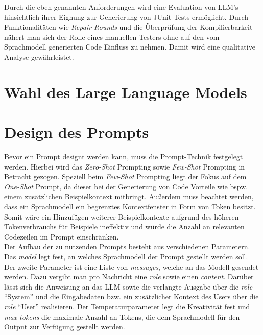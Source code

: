 Durch die eben genannten Anforderungen wird eine Evaluation von LLM's hinsichtlich ihrer Eignung zur Generierung von JUnit Tests ermöglicht. Durch Funktionalitäten wie \textit{Repair Rounds} und die Überprüfung der Kompilierbarkeit nähert man sich der Rolle eines manuellen Testers ohne auf den vom Sprachmodell generierten Code Einfluss zu nehmen. Damit wird eine qualitative Analyse gewährleistet.

\section{Wahl des Large Language Models}


\section{Design des Prompts}
Bevor ein Prompt designt werden kann, muss die Prompt-Technik festgelegt werden. Hierbei wird das \textit{Zero-Shot} Prompting sowie \textit{Few-Shot} Prompting in Betracht gezogen. Speziell beim \textit{Few-Shot} Prompting liegt der Fokus auf dem \textit{One-Shot} Prompt, da dieser bei der Generierung von Code Vorteile wie bspw. einem zusätzlichen Beispielkontext mitbringt. Außerdem muss beachtet werden, dass ein Sprachmodell ein begrenztes Kontextfenster in Form von Token besitzt. Somit wäre ein Hinzufügen weiterer Beispielkontexte aufgrund des höheren Tokenverbrauchs für Beispiele ineffektiv und würde die Anzahl an relevanten Codezeilen im Prompt einschränken.\\
Der Aufbau der zu nutzenden Prompts besteht aus verschiedenen Parametern. Das \textit{model} legt fest, an welches Sprachmodell der Prompt gestellt werden soll. Der zweite Parameter ist eine Liste von \textit{messages}, welche an das Modell gesendet werden. Dazu vergibt man pro Nachricht eine \textit{role} sowie einen \textit{content}. Darüber lässt sich die Anweisung an das LLM sowie die verlangte Ausgabe über die \textit{role} ``System'' und die Eingabedaten bzw. ein zusätzlicher Kontext des Users über die \textit{role} ``User'' realisieren. Der Temperaturparameter legt die Kreativität fest und \textit{max tokens} die maximale Anzahl an Tokens, die dem Sprachmodell für den Output zur Verfügung gestellt werden.\\
